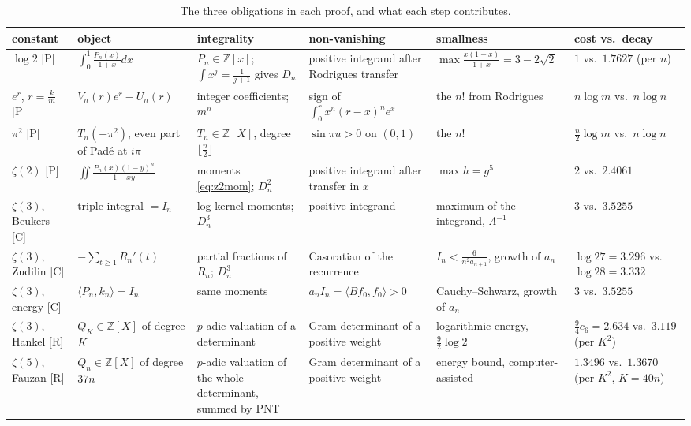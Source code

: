 \documentclass[11pt,a4paper]{article}
\newcommand{\Z}{\mathbb Z}
\newcommand{\st}[1]{\textsf{[#1]}}
\theoremstyle{definition}
\begin{document}
\begin{table}[t]
\centering\footnotesize
\setlength{\tabcolsep}{3.5pt}
\begin{tabular}{@{}p{18mm}p{25mm}p{26mm}p{27mm}p{25mm}p{26mm}@{}}
\toprule
constant & object & integrality & non-vanishing & smallness & cost vs.\ decay\\
\midrule
$\log2$ \st{P} & $\int_0^1\frac{P_n(x)}{1+x}dx$ & $P_n\in\Z[x]$; $\int x^j=\frac1{j+1}$ gives $D_n$
 & positive integrand after Rodrigues transfer & $\max\frac{x(1-x)}{1+x}=3-2\sqrt2$ & $1$ vs.\ $1.7627$ (per $n$)\\[2pt]
$e^{r}$, $r=\frac km$ \st{P} & $V_n(r)e^r-U_n(r)$ & integer coefficients; $m^n$ & sign of
 $\int_0^r x^n(r-x)^ne^x$ & the $n!$ from Rodrigues & $n\log m$ vs.\ $n\log n$\\[2pt]
$\pi^2$ \st{P} & $T_n(-\pi^2)$, even part of Pad\'e at $i\pi$ & $T_n\in\Z[X]$, degree
 $\lfloor\frac n2\rfloor$ & $\sin\pi u>0$ on $(0,1)$ & the $n!$ & $\frac n2\log m$ vs.\ $n\log n$\\[2pt]
$\zeta(2)$ \st{P} & $\iint\frac{P_n(x)(1-y)^n}{1-xy}$ & moments \eqref{eq:z2mom}; $D_n^2$ & positive
 integrand after transfer in $x$ & $\max h=g^5$ & $2$ vs.\ $2.4061$\\[2pt]
$\zeta(3)$, Beukers \st{C} & triple integral $=I_n$ & log-kernel moments; $D_n^3$ & positive
 integrand & maximum of the integrand, $\Lambda^{-1}$ & $3$ vs.\ $3.5255$\\[2pt]
$\zeta(3)$, Zudilin \st{C} & $-\sum_{t\ge1}R_n'(t)$ & partial fractions of $R_n$; $D_n^3$ &
 Casoratian of the recurrence & $I_n<\frac6{n^2a_{n+1}}$, growth of $a_n$ & $\log27=3.296$ vs.\ $\log28=3.332$\\[2pt]
$\zeta(3)$, energy \st{C} & $\langle P_n,k_n\rangle=I_n$ & same moments & $a_nI_n=\langle Bf_0,f_0\rangle>0$
 & Cauchy--Schwarz, growth of $a_n$ & $3$ vs.\ $3.5255$\\[2pt]
$\zeta(3)$, Hankel \st{R} & $Q_K\in\Z[X]$ of degree $K$ & $p$-adic valuation of a determinant &
 Gram determinant of a positive weight & logarithmic energy, $\frac92\log2$ &
 $\frac94c_6=2.634$ vs.\ $3.119$ (per $K^2$)\\[2pt]
$\zeta(5)$, Fauzan \st{R} & $Q_n\in\Z[X]$ of degree $37n$ & $p$-adic valuation of the whole determinant,
 summed by PNT & Gram determinant of a positive weight & energy bound, computer-assisted &
 $1.3496$ vs.\ $1.3670$ (per $K^2$, $K=40n$)\\
\bottomrule
\end{tabular}
\caption{The three obligations in each proof, and what each step contributes.}\label{tab:main}
\end{table}
\end{document}
